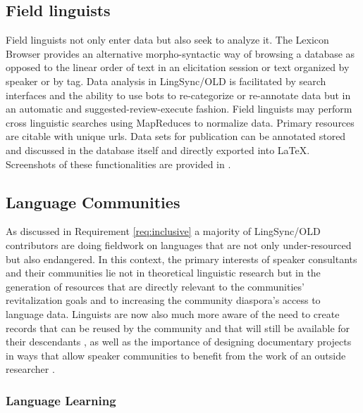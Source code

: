 \documentclass[11pt]{article}
\begin{document}
\subsection{Field linguists}

Field linguists not only enter data but also seek to analyze it. The Lexicon Browser provides an alternative morpho-syntactic way of browsing a database as opposed to the linear order of text in an elicitation session or text organized by speaker or by tag. Data analysis in LingSync/OLD is facilitated by search  interfaces and the ability to use bots to re-categorize or re-annotate data but in an automatic and suggested-review-execute fashion. Field linguists may perform cross linguistic searches using MapReduces to normalize data. Primary resources are citable with unique urls. Data sets for publication can be annotated stored and discussed in the database itself and directly exported into LaTeX.  Screenshots of these functionalities are provided in \cite{lingsync:2012}.

%
\subsection{Language Communities}

As discussed in Requirement \autoref{req:inclusive} a majority of LingSync/OLD contributors are doing fieldwork on languages that
are not only under-resourced but also endangered. In this context, the primary
interests of speaker consultants and their communities lie not in theoretical
linguistic research but in the generation of resources that are directly
relevant to the communities' revitalization goals and to increasing the community diaspora's
access to language data. Linguists are now also much more aware of the need to
create records that can be reused by the community and that will still be
available for their descendants \cite[p.129]{Thieberger:2012}, as well as the
importance of designing documentary projects in ways that allow speaker
communities to benefit from the work of an outside researcher \cite{Good:2012}.


\subsubsection{Language Learning}
\end{document}
